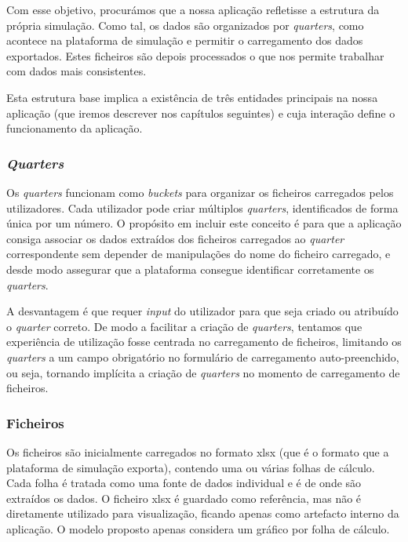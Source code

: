 Com esse objetivo, procurámos que a nossa aplicação refletisse a estrutura da própria simulação. Como tal, os dados são organizados por \textit{quarters}, como acontece na plataforma de simulação e permitir o carregamento dos dados exportados. Estes ficheiros são depois processados o que nos permite trabalhar com dados mais consistentes. 

Esta estrutura base implica a existência de três entidades principais na nossa aplicação (que iremos descrever nos capítulos seguintes) e cuja interação define  o funcionamento da aplicação.

\subsubsection{\textit{Quarters}}

Os \textit{quarters} funcionam como \textit{buckets} para organizar os ficheiros carregados pelos utilizadores. Cada utilizador pode criar múltiplos \textit{quarters}, identificados de forma única por um número. O propósito em incluir este conceito é para que a aplicação consiga associar os dados extraídos dos ficheiros carregados ao \textit{quarter} correspondente sem depender de manipulações do nome do ficheiro carregado, e desde modo assegurar que a plataforma consegue identificar corretamente os \textit{quarters}. 

A desvantagem é que requer \textit{input} do utilizador para que seja criado ou atribuído o \textit{quarter} correto. De modo a facilitar a criação de \textit{quarters}, tentamos que experiência de utilização fosse centrada no carregamento de ficheiros, limitando os \textit{quarters} a um campo obrigatório no formulário de carregamento auto-preenchido, ou seja, tornando implícita a criação de \textit{quarters} no momento de carregamento de ficheiros.

\subsubsection{Ficheiros}

Os ficheiros são inicialmente carregados no formato \gls{xlsx} (que é o formato que a plataforma de simulação exporta), contendo uma ou várias folhas de cálculo. Cada folha é tratada como uma fonte de dados individual e é de onde são extraídos os dados. O ficheiro \gls{xlsx} é guardado como referência, mas não é diretamente utilizado para visualização, ficando apenas como artefacto interno da aplicação. O modelo proposto apenas considera um gráfico por folha de cálculo.

